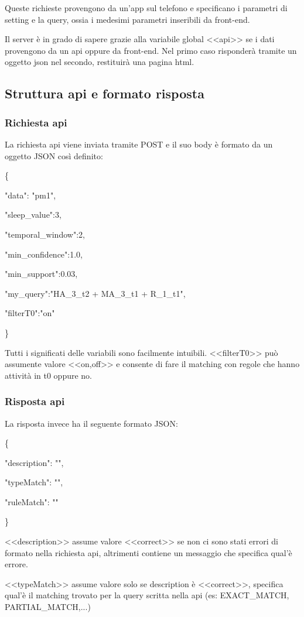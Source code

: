 \documentclass[a4paper]{article}
\begin{document}
Queste richieste provengono da un'app sul telefono e specificano i parametri di setting e la query, ossia i medesimi parametri inseribili da front-end.

Il server è in grado di sapere grazie alla variabile global <<api>> se i dati provengono da un api oppure da front-end. Nel primo caso risponderà tramite un oggetto json nel secondo, restituirà una pagina html.
\subsection{Struttura api e formato risposta}
\subsubsection{Richiesta api}
La richiesta api viene inviata tramite POST e il suo body è formato da un oggetto JSON così definito:

\{
   
 "data": "pm1",

    "sleep\_value":3,

    "temporal\_window":2,

    "min\_confidence":1.0,

    "min\_support":0.03,

    "my\_query":"HA\_3\_t2 + MA\_3\_t1 + R\_1\_t1",

    "filterT0":"on"

\}

Tutti i significati delle variabili sono facilmente intuibili. <<filterT0>> può assumente valore <<on,off>> e consente di fare il matching con regole che hanno attività in t0 oppure no.

\subsubsection{Risposta api}
La risposta invece ha il seguente formato JSON:

\{

"description": "", 

"typeMatch": "", 

"ruleMatch": ""

\}

<<description>> assume valore <<correct>> se non ci sono stati errori di formato nella richiesta api, altrimenti contiene un messaggio che specifica qual'è errore.

<<typeMatch>> assume valore solo se description è <<correct>>, specifica qual'è il matching trovato per la query scritta nella api (es: EXACT\_MATCH, PARTIAL\_MATCH,...)
\end{document}
